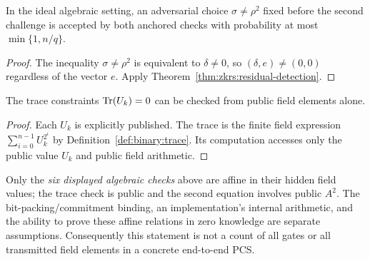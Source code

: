 \begin{corollary}\label{cor:zkrs:no-quadratic-secret-check}
In the ideal algebraic setting, an adversarial choice
$\sigma\ne\rho^2$ fixed before the second challenge
is accepted by both anchored checks with probability
at most $\min\{1,n/q\}$.
\end{corollary}
\begin{proof}
The inequality $\sigma\ne\rho^2$
is equivalent to $\delta\ne0$,
so $(\delta,e)\ne(0,0)$ regardless
of the vector $e$. Apply
Theorem~\ref{thm:zkrs:residual-detection}.
\end{proof}

\begin{lemma}\label{lem:zkrs:public-traces}
The trace constraints $\operatorname{Tr}(U_k)=0$ can be
checked from public field elements alone.
\end{lemma}
\begin{proof}
Each $U_k$ is explicitly published.
The trace is the finite field expression
$\sum_{i=0}^{n-1}U_k^{2^i}$ by
Definition~\ref{def:binary:trace}.
Its computation accesses only the
public value $U_k$ and public field arithmetic.
\end{proof}

\begin{remark}
Only the \emph{six displayed algebraic checks}
above are affine in their hidden field values;
the trace check is public and the second
equation involves public $A^2$.
The bit-packing/commitment binding,
an implementation's internal arithmetic,
and the ability to prove these affine
relations in zero knowledge are separate
assumptions. Consequently this statement
is not a count of all gates or all transmitted
field elements in a concrete end-to-end PCS.
\end{remark}
